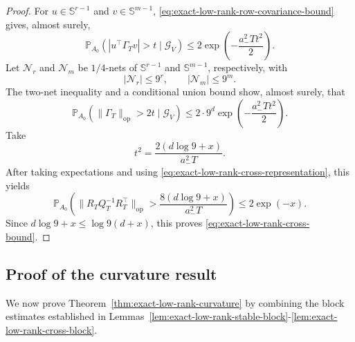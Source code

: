 \documentclass[11pt]{article}
\begin{document}
\begin{proof}
For $u\in\mathbb S^{r-1}$ and $v\in\mathbb S^{m-1}$,
\eqref{eq:exact-low-rank-row-covariance-bound} gives, almost surely,
\[
    \mathbb P_{A_0}\!\left(
        |u^\top \Gamma_Tv|>t\mid\mathcal G_V
    \right)
    \leq2\exp\!\left(-\frac{a_-^2Tt^2}{2}\right).
\]
Let $\mathcal N_r$ and $\mathcal N_m$ be $1/4$-nets of
$\mathbb S^{r-1}$ and $\mathbb S^{m-1}$, respectively, with
\[
    |\mathcal N_r|\leq9^r,
    \qquad
    |\mathcal N_m|\leq9^m.
\]
The two-net inequality and a conditional union bound show, almost surely, that
\[
    \mathbb P_{A_0}\!\left(
        \|\Gamma_T\|_{\mathrm{op}}>2t\mid\mathcal G_V
    \right)
    \leq2\cdot9^d\exp\!\left(-\frac{a_-^2Tt^2}{2}\right).
\]
Take
\[
    t^2=\frac{2(d\log9+x)}{a_-^2T}.
\]
After taking expectations and using \eqref{eq:exact-low-rank-cross-representation},
this yields
\[
    \mathbb P_{A_0}\!\left(
        \|R_TQ_T^{-1}R_T^\top\|_{\mathrm{op}}
        >\frac{8(d\log9+x)}{a_-^2T}
    \right)
    \leq2\exp(-x).
\]
Since $d\log9+x\leq\log9(d+x)$, this proves
\eqref{eq:exact-low-rank-cross-bound}.
\end{proof}

\subsection{Proof of the curvature result}
\label{subsec:proof-exact-low-rank-curvature}

We now prove Theorem~\ref{thm:exact-low-rank-curvature} by combining the block estimates established in Lemmas~\ref{lem:exact-low-rank-stable-block}-\ref{lem:exact-low-rank-cross-block}.
\end{document}
